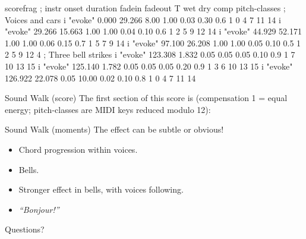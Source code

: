 \documentclass{beamer}
\begin{document}
\begin{SaveVerbatim}{scorefrag}
; instr     onset duration  fadein fadeout      T    wet    dry  comp  pitch-classes
; Voices and cars
i "evoke"   0.000   29.266    8.00    1.00   0.03   0.30    0.6     1  0  4  7 11 14
i "evoke"  29.266   15.663    1.00    1.00   0.04   0.10    0.6     1  2  5  9 12 14
i "evoke"  44.929   52.171    1.00    1.00   0.06   0.15    0.7     1  5  7  9 14
i "evoke"  97.100   26.208    1.00    1.00   0.05   0.10    0.5     1  2  5  9 12  4
; Three bell strikes
i "evoke" 123.308    1.832    0.05    0.05   0.05   0.10    0.9     1  7 10 13 15
i "evoke" 125.140    1.782    0.05    0.05   0.05   0.20    0.9     1  3  6 10 13 15
i "evoke" 126.922   22.078    0.05   10.00   0.02   0.10    0.8     1  0  4  7 11 14
\end{SaveVerbatim}

\begin{frame}{Sound Walk (score)}
	The first section of this score is (compensation 1 = equal energy;
	pitch-classes are MIDI keys reduced modulo 12):
\begin{flushleft}
\end{flushleft}
\end{frame}

\begin{frame}{Sound Walk (moments)}
	The effect can be subtle or obvious!
  \begin{itemize}
	\item Chord progression within voices.
	\item Bells.
	\item Stronger effect in bells, with voices following.
	\item \emph{``Bonjour!''}
  \end{itemize}
\end{frame}

\begin{frame}{Questions?}
\end{frame}
\end{document}
